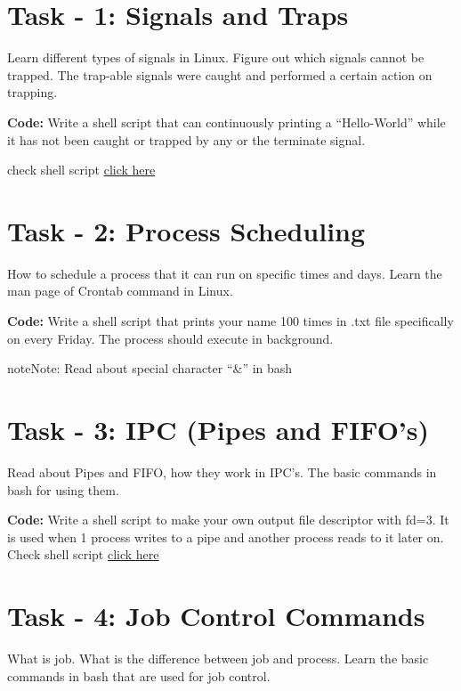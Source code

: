 \documentclass[letterpaper,10pt,english]{sphinxmanual}
\begin{document}
\section{Task - 1: Signals and Traps}
\label{week-02:task-1-signals-and-traps}
Learn different types of signals in Linux. Figure out which signals cannot be trapped. The trap-able signals were caught and performed a certain action on trapping.

\textbf{Code:} Write a shell script that can continuously printing a “Hello-World” while it has not been caught or trapped by any or the terminate signal.

check shell script \href{https://github.com/Ahmer-444/personal-repo/blob/master/signal-trap.sh}{click here}


\section{Task - 2: Process Scheduling}
\label{week-02:task-2-process-scheduling}
How to schedule a process that it can run on specific times and days. Learn the man page of Crontab command in Linux.

\textbf{Code:} Write a shell script that prints your name 100 times in .txt file specifically on every Friday. The process should execute in background.

\begin{notice}{note}{Note:}
Read about special character ``\&'' in bash
\end{notice}


\section{Task - 3: IPC (Pipes and FIFO's)}
\label{week-02:task-3-ipc-pipes-and-fifo-s}
Read about Pipes and FIFO, how they work in IPC's. The basic commands in bash for using them.

\textbf{Code:} Write a shell script to make your own output file descriptor with fd=3. It is used when 1 process writes to a pipe and another process reads to it later on.
Check shell script \href{https://github.com/Ahmer-444/personal-repo/blob/master/own\_output\_fd.sh}{click here}


\section{Task - 4: Job Control Commands}
\label{week-02:task-4-job-control-commands}
What is job. What is the difference between job and process. Learn the basic commands in bash that are used for job control.
\end{document}
